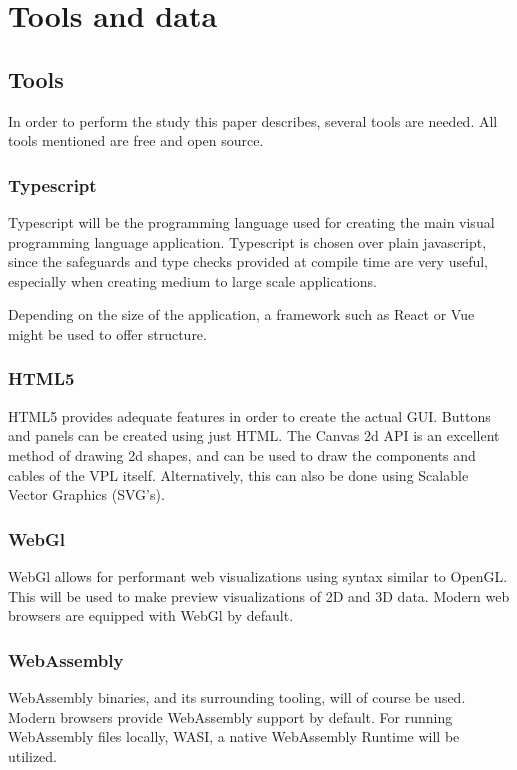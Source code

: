 \newpage
\section{Tools and data}

\subsection{Tools}
In order to perform the study this paper describes, several tools are needed. All tools mentioned are free and open source.

\subsubsection*{Typescript}
Typescript will be the programming language used for creating the main visual programming language application. Typescript is chosen over plain javascript, since the safeguards and type checks provided at compile time are very useful, especially when creating medium to large scale applications. 

Depending on the size of the application, a framework such as React or Vue might be used to offer structure.

\subsubsection*{HTML5}
HTML5 provides adequate features in order to create the actual GUI. Buttons and panels can be created using just HTML. The Canvas 2d API is an excellent method of drawing 2d shapes, and can be used to draw the components and cables of the VPL itself. Alternatively, this can also be done using Scalable Vector Graphics (SVG's). 

\subsubsection*{WebGl}
WebGl allows for performant web visualizations using syntax similar to OpenGL. This will be used to make preview visualizations of 2D and 3D data. Modern web browsers are equipped with WebGl by default. 

\subsubsection*{WebAssembly}
WebAssembly binaries, and its surrounding tooling, will of course be used. Modern browsers provide WebAssembly support by default. For running WebAssembly files locally, WASI, a native WebAssembly Runtime will be utilized. 

